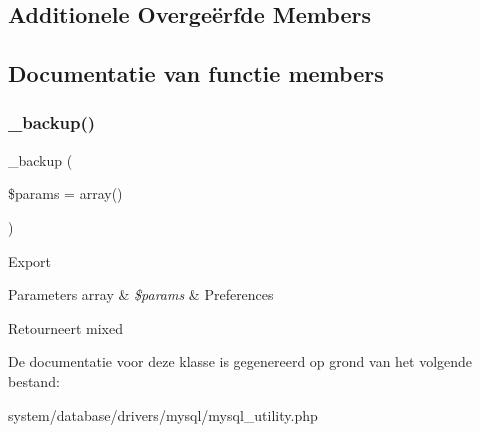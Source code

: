 \subsection*{Additionele Overge\"{e}rfde Members}


\subsection{Documentatie van functie members}
\mbox{\label{class_c_i___d_b__mysql__utility_a30f3053d2c82e7562349924363507afa}} 
\subsubsection{\texorpdfstring{\_backup()}{\_backup()}}
{\footnotesize\ttfamily \+\_\+backup (\begin{DoxyParamCaption}\item[{}]{\$params = {\ttfamily array()} }\end{DoxyParamCaption})\hspace{0.3cm}{\ttfamily [protected]}}

Export


\begin{DoxyParams}[1]{Parameters}
array & {\em \$params} & Preferences \\
\hline
\end{DoxyParams}
\begin{DoxyReturn}{Retourneert}
mixed 
\end{DoxyReturn}


De documentatie voor deze klasse is gegenereerd op grond van het volgende bestand\+:\begin{DoxyCompactItemize}
\item 
system/database/drivers/mysql/mysql\+\_\+utility.\+php\end{DoxyCompactItemize}
